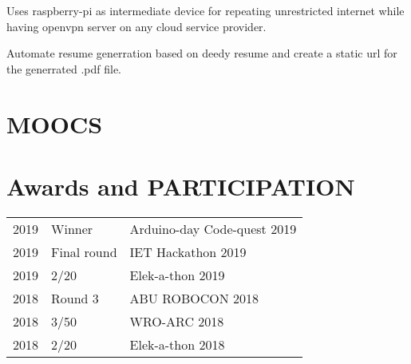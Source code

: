 \documentclass[]{deedy-resume-openfont}
\begin{document}
\begin{minipage}[t][18cm]{0.66\textwidth}
Uses raspberry-pi as intermediate device for repeating unrestricted internet while having openvpn server on any cloud service provider.
\sectionsep

Automate resume generration based on deedy resume and create a static url for the generrated .pdf file.
\sectionsep


\section{MOOCS}
\sectionsep

\section{Awards and PARTICIPATION} 
\begin{tabular}{rll}
2019	     & Winner  & Arduino-day Code-quest 2019\\
2019	     & Final round  & IET Hackathon 2019\\
2019	     & 2/20  & Elek-a-thon 2019\\
2018	     & Round 3  & ABU ROBOCON 2018\\
2018	     & 3/50  & WRO-ARC 2018\\
2018	     & 2/20  & Elek-a-thon 2018\\
\end{tabular}
\sectionsep


% 
% 

\end{minipage} 
\end{document}
